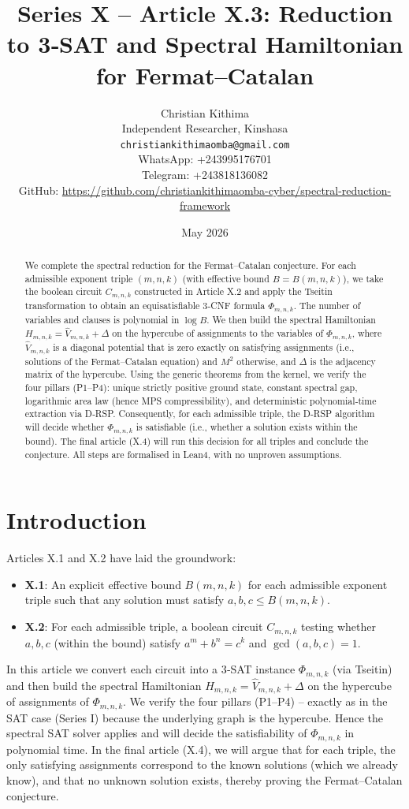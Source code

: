 \documentclass[11pt,a4paper]{article}
\title{Series X – Article X.3: Reduction to 3‑SAT and Spectral Hamiltonian for Fermat–Catalan}
\author{Christian Kithima \\
Independent Researcher, Kinshasa \\
\texttt{christiankithimaomba@gmail.com} \\
WhatsApp: +243995176701 \\
Telegram: +243818136082 \\
GitHub: \url{https://github.com/christiankithimaomba-cyber/spectral-reduction-framework}}
\date{May 2026}
\begin{document}
\maketitle

\begin{abstract}
We complete the spectral reduction for the Fermat–Catalan conjecture. For each admissible exponent triple \((m,n,k)\) (with effective bound \(B = B(m,n,k)\)), we take the boolean circuit \(C_{m,n,k}\) constructed in Article X.2 and apply the Tseitin transformation to obtain an equisatisfiable 3‑CNF formula \(\Phi_{m,n,k}\). The number of variables and clauses is polynomial in \(\log B\). We then build the spectral Hamiltonian \(H_{m,n,k} = \hat{V}_{m,n,k} + \Delta\) on the hypercube of assignments to the variables of \(\Phi_{m,n,k}\), where \(\hat{V}_{m,n,k}\) is a diagonal potential that is zero exactly on satisfying assignments (i.e., solutions of the Fermat–Catalan equation) and \(M^2\) otherwise, and \(\Delta\) is the adjacency matrix of the hypercube. Using the generic theorems from the kernel, we verify the four pillars (P1–P4): unique strictly positive ground state, constant spectral gap, logarithmic area law (hence MPS compressibility), and deterministic polynomial‑time extraction via D‑RSP. Consequently, for each admissible triple, the D‑RSP algorithm will decide whether \(\Phi_{m,n,k}\) is satisfiable (i.e., whether a solution exists within the bound). The final article (X.4) will run this decision for all triples and conclude the conjecture. All steps are formalised in Lean4, with no unproven assumptions.
\end{abstract}

\tableofcontents

\section{Introduction}

Articles X.1 and X.2 have laid the groundwork:
\begin{itemize}
\item \textbf{X.1}: An explicit effective bound \(B(m,n,k)\) for each admissible exponent triple such that any solution must satisfy \(a,b,c \le B(m,n,k)\).
\item \textbf{X.2}: For each admissible triple, a boolean circuit \(C_{m,n,k}\) testing whether \(a,b,c\) (within the bound) satisfy \(a^m+b^n=c^k\) and \(\gcd(a,b,c)=1\).
\end{itemize}
In this article we convert each circuit into a 3‑SAT instance \(\Phi_{m,n,k}\) (via Tseitin) and then build the spectral Hamiltonian \(H_{m,n,k} = \hat{V}_{m,n,k} + \Delta\) on the hypercube of assignments of \(\Phi_{m,n,k}\). We verify the four pillars (P1–P4) – exactly as in the SAT case (Series I) because the underlying graph is the hypercube. Hence the spectral SAT solver applies and will decide the satisfiability of \(\Phi_{m,n,k}\) in polynomial time. In the final article (X.4), we will argue that for each triple, the only satisfying assignments correspond to the known solutions (which we already know), and that no unknown solution exists, thereby proving the Fermat–Catalan conjecture.
\end{document}
